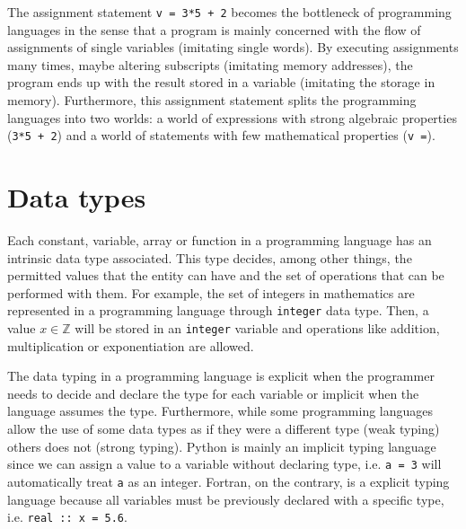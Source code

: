 The assignment statement \texttt{v = 3*5 + 2} becomes the bottleneck of programming languages in the sense that a program is mainly concerned 
with the flow of assignments of single variables (imitating single words). 
By executing assignments many times, maybe altering subscripts (imitating memory addresses), 
the program ends up with the result stored in a variable (imitating the storage in memory). 
Furthermore, this assignment statement splits the programming languages into two worlds: 
a world of expressions with strong algebraic properties (\texttt{3*5 + 2}) and a world of statements with few mathematical properties (\texttt{v =}).








    \section{Data types} 



Each constant, variable, array or function in a programming language has an intrinsic data type associated. 
This type decides, among other things, the permitted values that the entity can have and the set of operations that can be performed with them.
For example, the set of integers in mathematics are represented in a programming language through \texttt{integer} data type. 
Then, a value $x\in \mathbb{Z}$ will be stored in an \texttt{integer} variable and operations like addition, multiplication or exponentiation are allowed. 

The data typing in a programming language is explicit when the programmer needs to decide and declare the type for each variable or implicit when the language assumes the type. 
Furthermore, while some programming languages allow the use of some data types as if they were a different type (weak typing) others does not (strong typing). 
Python is mainly an implicit typing language since we can assign a value to a variable without declaring type, i.e. \texttt{a = 3} will automatically treat \texttt{a} as an integer. 
Fortran, on the contrary, is a explicit typing language because all variables must be previously declared with a specific type, i.e. \texttt{real :: x = 5.6}.




